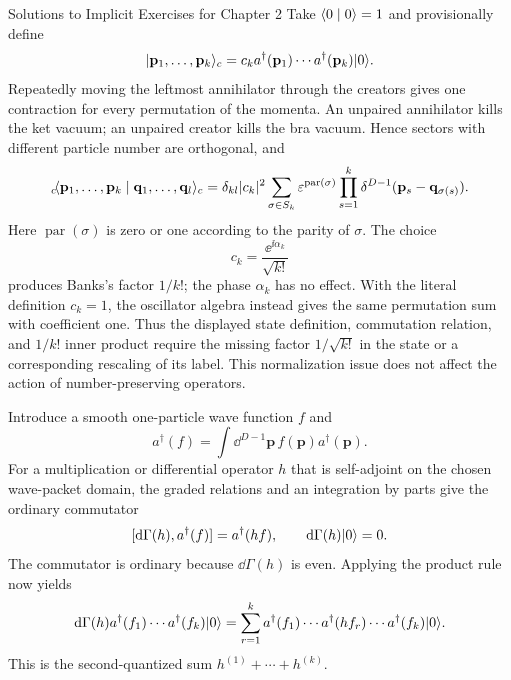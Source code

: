 \begin{bankssolutions}{Solutions to Implicit Exercises for Chapter 2}
Take $\langle 0\mid 0\rangle=1$ and provisionally define
\[
  \lvert \mathbf p_1,\ldots,\mathbf p_k\rangle_c
  =c_k a^\dagger(\mathbf p_1)\cdots
  a^\dagger(\mathbf p_k)\lvert 0\rangle.
\]
Repeatedly moving the leftmost annihilator through
the creators gives one contraction for every permutation of the momenta. An
unpaired annihilator kills the ket vacuum; an unpaired creator kills the bra
vacuum. Hence sectors with different particle number are orthogonal, and
\[
  {}_c\!\langle \mathbf p_1,\ldots,\mathbf p_k\mid \mathbf q_1,\ldots,\mathbf q_l\rangle_{c}
  =\delta_{kl}|c_k|^2
   \sum_{\sigma\in S_k}
   \varepsilon^{\operatorname{par}(\sigma)}
   \prod_{s=1}^k\delta^{D-1}(\mathbf p_s-\mathbf q_{\sigma(s)}).
\]
Here $\operatorname{par}(\sigma)$ is zero or one according to the parity of
$\sigma$. The choice
\[
  c_k=\frac{\ee^{\ii\alpha_k}}{\sqrt{k!}}
\]
produces Banks's factor $1/k!$; the phase $\alpha_k$ has no effect. With the
literal definition $c_k=1$, the oscillator algebra instead gives the same
permutation sum with coefficient one. Thus the displayed state definition,
commutation relation, and $1/k!$ inner product require the missing factor
$1/\sqrt{k!}$ in the state or a corresponding rescaling of its label. This
normalization issue does not affect the action of number-preserving operators.

Introduce a smooth one-particle wave function $f$ and
\[
  a^\dagger(f)=\int\dd^{D-1}\mathbf p\,f(\mathbf p)a^\dagger(\mathbf p).
\]
For a multiplication or differential operator $h$ that is self-adjoint on the
chosen wave-packet domain, the graded relations and an integration by parts
give the ordinary commutator
\[
  [\mathop{}\!\mathrm{d}\Gamma(h),a^\dagger(f)]=a^\dagger(hf),
  \qquad \mathop{}\!\mathrm{d}\Gamma(h)\lvert 0\rangle=0.
\]
The commutator is ordinary because $\dd\Gamma(h)$ is even. Applying the product
rule now yields
\begin{align*}
  \mathop{}\!\mathrm{d}\Gamma(h)a^\dagger(f_1)\cdots a^\dagger(f_k)\lvert 0\rangle
  =\sum_{r=1}^k
  a^\dagger(f_1)\cdots a^\dagger(hf_r)\cdots
  a^\dagger(f_k)\lvert 0\rangle.
\end{align*}
This is the second-quantized sum $h^{(1)}+\cdots+h^{(k)}$.


\end{bankssolutions}
